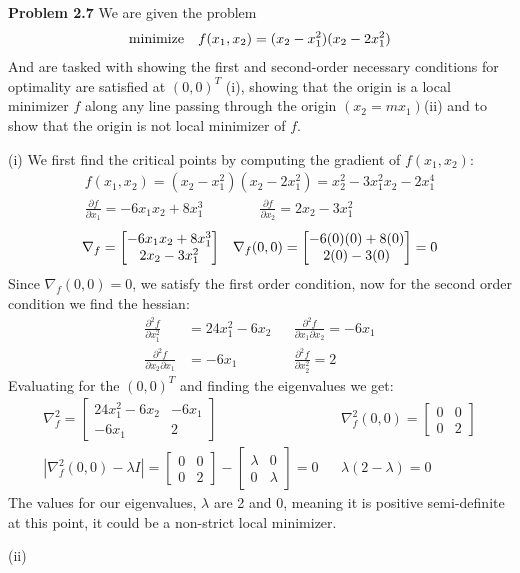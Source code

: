 \documentclass{article}
\begin{document}
 
\pagestyle{fancy}
\textbf{Problem 2.7} We are given the problem
\begin{align*}
    \text{minimize} \null \quad f(x_1,x_2) = (x_2 - x_1^2)(x_2-2x_1^2)
\end{align*}
And are tasked with showing the first and second-order necessary conditions for optimality are satisfied at $(0,0)^T$ (i), 
showing that the origin is a local minimizer $f$ along any line passing through the origin $(x_2 = mx_1)$(ii) and to show that the origin is not local minimizer of $f$.

(i) We first find the critical points by computing the gradient of $f(x_1, x_2)$:
\begin{align*}
    f(x_1,x_2) = (x_2 - x_1^2)(x_2-2x_1^2) = x_2^2 - 3x_1^2x_2 - 2x_1^4 \\
    \frac{\partial f}{\partial x_1}  = -6x_1x_2 + 8x_1^3 \qquad \qquad  \frac{\partial f}{\partial x_2} = 2x_2 - 3x_1^2
\end{align*}
\begin{align*}
    \null \nabla_f = \begin{bmatrix} -6x_1x_2 + 8x_1^3 \\ 2x_2 - 3x_1^2 \end{bmatrix} && 
        \null \nabla_f (0,0) = \begin{bmatrix} -6(0)(0) + 8(0) \\ 2(0) - 3(0) \end{bmatrix} = 0
\end{align*}
Since $\nabla_f(0,0) = 0$, we satisfy the first order condition, now for the second order condition we find the hessian:
\begin{align*}
    \frac{\partial^2f}{\partial x_1^2} &= 24x_1^2 - 6x_2 && \frac{\partial^2f}{\partial x_1 \partial x_2} = -6x_1 \\ 
    \frac{\partial^2f}{\partial x_2 \partial x_1} &= -6x_1 && \frac{\partial^2f}{\partial x_2^2} = 2 
\end{align*}
Evaluating for the $(0,0)^T$ and finding the eigenvalues we get:
\begin{align*}\nabla_f^2 = 
    \begin{bmatrix}
     24x_1^2 - 6x_2 & -6x_1 \\ 
    -6x_1 & 2 
    \end{bmatrix} && 
    \nabla_f^2(0,0) = 
    \begin{bmatrix}
    0 & 0 \\ 
    0  & 2 
    \end{bmatrix} \\
    |\nabla_f^2(0,0) - \lambda I | = 
    \begin{bmatrix}
    0 & 0 \\ 
    0  & 2 
    \end{bmatrix} - 
    \begin{bmatrix}
        \lambda & 0 \\
        0 & \lambda
    \end{bmatrix} = 0 &&
    \lambda(2-\lambda) = 0
\end{align*}
The values for our eigenvalues, $\lambda$ are 2 and 0, meaning it is positive semi-definite at this point, it could be a non-strict local minimizer.

(ii)
\end{document}

